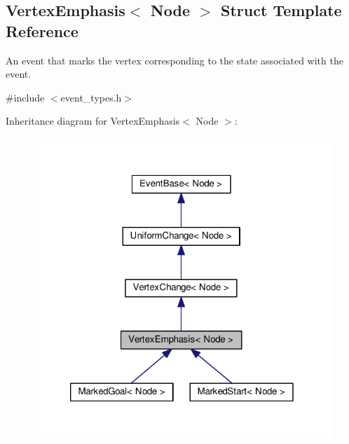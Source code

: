 \hypertarget{structVertexEmphasis}{}\subsection{Vertex\+Emphasis$<$ Node $>$ Struct Template Reference}
\label{structVertexEmphasis}


An event that marks the vertex corresponding to the state associated with the event.  




{\ttfamily \#include $<$event\+\_\+types.\+h$>$}



Inheritance diagram for Vertex\+Emphasis$<$ Node $>$\+:\nopagebreak
\begin{figure}[H]
\begin{center}
\leavevmode
\includegraphics[width=320pt]{structVertexEmphasis__inherit__graph}
\end{center}
\end{figure}


